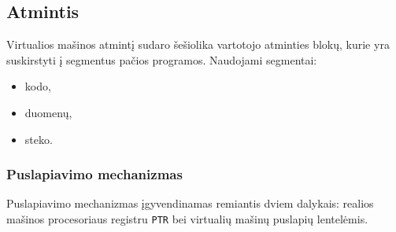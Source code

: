 \documentclass{scrartcl}
\begin{document}
        \subsection{Atmintis}
            Virtualios mašinos atmintį sudaro šešiolika vartotojo atminties blokų, kurie yra suskirstyti į segmentus pačios programos. Naudojami segmentai:
            \begin{itemize}
                \item kodo,
                \item duomenų,
                \item steko.
            \end{itemize}
            \subsubsection{Puslapiavimo mechanizmas}
                Puslapiavimo mechanizmas įgyvendinamas remiantis dviem dalykais: realios mašinos procesoriaus registru \texttt{PTR} bei virtualių mašinų puslapių lentelėmis.
\end{document}
